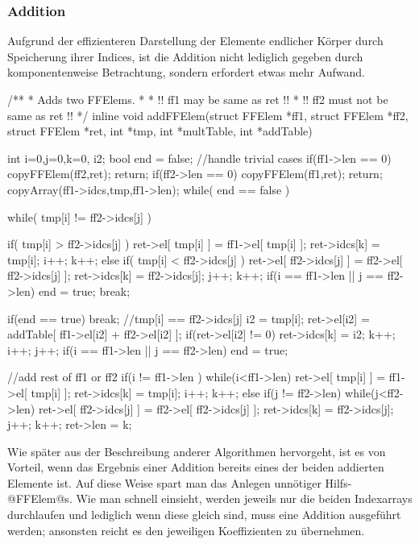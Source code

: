 \subsubsection{Addition}
Aufgrund der effizienteren Darstellung der Elemente endlicher Körper durch
Speicherung ihrer Indices, ist die Addition nicht lediglich gegeben durch
komponentenweise Betrachtung, sondern erfordert etwas mehr Aufwand.

\begin{ccode}[caption={Aus \url{../Sage/enumeratePCNs.c}},
  firstnumber=226]
/**
 * Adds two FFElems.
 *
 * !! ff1 may be same as ret !!
 * !! ff2 must not be same as ret !!
 */
inline void addFFElem(struct FFElem *ff1, struct FFElem *ff2,
        struct FFElem *ret,
        int *tmp,
        int *multTable, int *addTable){
    int i=0,j=0,k=0, i2;
    bool end = false;
    //handle trivial cases
    if(ff1->len == 0){
        copyFFElem(ff2,ret);
        return;
    }
    if(ff2->len == 0){
        copyFFElem(ff1,ret);
        return;
    }
    copyArray(ff1->idcs,tmp,ff1->len);
    while( end == false ){
        while( tmp[i] != ff2->idcs[j] ){
            if( tmp[i] > ff2->idcs[j] ){
                ret->el[ tmp[i] ] = ff1->el[ tmp[i] ];
                ret->idcs[k] = tmp[i];
                i++; k++;
            }else if( tmp[i] < ff2->idcs[j] ){
                ret->el[ ff2->idcs[j] ] = ff2->el[ ff2->idcs[j] ];
                ret->idcs[k] = ff2->idcs[j];
                j++; k++;
            }
            if(i == ff1->len || j == ff2->len){
                end = true;
                break;
            }

        }
        if(end == true) break;
        //tmp[i] == ff2->idcs[j]
        i2 = tmp[i];
        ret->el[i2] = addTable[ ff1->el[i2] + ff2->el[i2] ];
        if(ret->el[i2] != 0){
            ret->idcs[k] = i2;
            k++;
        }
        i++; j++;
        if(i == ff1->len || j == ff2->len) end = true;
    }
    //add rest of ff1 or ff2
    if(i != ff1->len ){
        while(i<ff1->len){
            ret->el[ tmp[i] ] = ff1->el[ tmp[i] ];
            ret->idcs[k] = tmp[i];
            i++; k++;
        }
    }else if(j != ff2->len){
        while(j<ff2->len){
            ret->el[ ff2->idcs[j] ] = ff2->el[ ff2->idcs[j] ];
            ret->idcs[k] = ff2->idcs[j];
            j++; k++;
        }
    }
    ret->len = k;
}
\end{ccode}  

Wie später aus der Beschreibung anderer Algorithmen hervorgeht, ist es von
Vorteil, wenn das Ergebnis einer Addition bereits eines der beiden addierten
Elemente ist. Auf diese Weise spart man das Anlegen unnötiger Hilfs-@FFElem@s.
Wie man schnell einsieht, werden jeweils nur die beiden Indexarrays durchlaufen
und lediglich wenn diese gleich sind, muss eine Addition ausgeführt werden;
ansonsten reicht es den jeweiligen Koeffizienten zu übernehmen.


